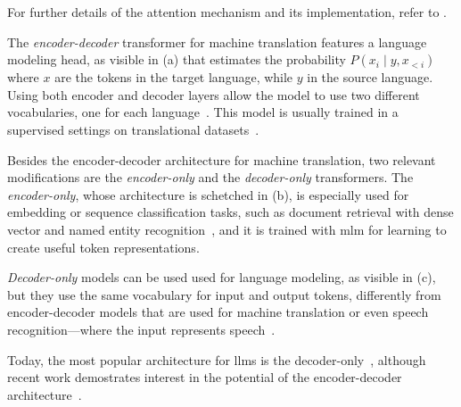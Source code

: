 For further details of the attention mechanism and its implementation, refer to \textcite{jm3}.

The \emph{encoder-decoder} transformer for machine translation features a language modeling head, as visible in (a) that estimates the probability $P(x_i \mid y,x_{<i})$ where $x$ are the tokens in the target language, while $y$ in the source language. Using both encoder and decoder layers allow the model to use two different vocabularies, one for each language~\cite{jm3}. This model is usually trained in a supervised settings on translational datasets~\cite{vaswani_transformers_2017}.

Besides the encoder-decoder architecture for machine translation, two relevant modifications are the \emph{encoder-only} and the \emph{decoder-only} transformers. The \emph{encoder-only}, whose architecture is schetched in (b), is especially used for embedding or sequence classification tasks, such as document retrieval with dense vector and named entity recognition~\cite{jm3,devlin-etal-2019-bert}, and it is trained with \ac{mlm} for learning to create useful token representations.

\emph{Decoder-only} models can be used used for language modeling, as visible in (c), but they use the same vocabulary for input and output tokens, differently from encoder-decoder models that are used for machine translation or even speech recognition---where the input represents speech~\cite{jm3}.

Today, the most popular architecture for \acp{llm} is the decoder-only~\cite{zhang2025encoderdecodergemmaimprovingqualityefficiency,qorib-etal-2024-decoder}, although recent work demostrates interest in the potential of the encoder-decoder architecture~\cite{zhang2025encoderdecodergemmaimprovingqualityefficiency}.

